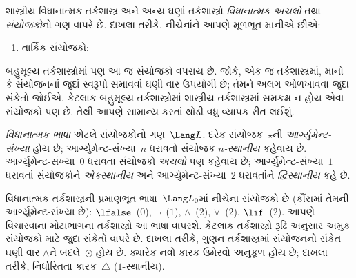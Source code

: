 \documentclass[../../../include/open-logic-section]{subfiles}
\begin{document}


શાસ્ત્રીય વિધાનાત્મક તર્કશાસ્ત્ર અને અન્ય ઘણાં
તર્કશાસ્ત્રો \emph{વિધાનાત્મક અચલો} તથા
\emph{સંયોજકો}નો ગણ વાપરે છે. દાખલા તરીકે,
નીચેનાંને આપણે મૂળભૂત માનીએ છીએ:
\begin{enumerate}
\item તાર્કિક સંયોજકો:
  \startycommalist
\end{enumerate}

બહુમૂલ્ય તર્કશાસ્ત્રોમાં પણ આ જ સંયોજકો વપરાય છે.
જોકે, એક જ તર્કશાસ્ત્રમાં, માનો કે સંયોજનનાં જુદાં
સ્વરૂપો સમાવવાં ઘણી વાર ઉપયોગી છે; તેમને અલગ
ઓળખાવવા જુદા સંકેતો જોઈએ. કેટલાક બહુમૂલ્ય
તર્કશાસ્ત્રોમાં શાસ્ત્રીય તર્કશાસ્ત્રમાં સમકક્ષ ન હોય
એવા સંયોજકો પણ છે. તેથી આપણે સામાન્ય કરતાં
થોડી વધુ વ્યાપક રીત લઈશું.

\begin{defn}
  \emph{વિધાનાત્મક ભાષા} એટલે સંયોજકોનો ગણ~$\Lang L$.
  દરેક સંયોજક~$\star$ની \emph{આર્ગ્યુમેન્ટ-સંખ્યા}
  હોય છે; આર્ગ્યુમેન્ટ-સંખ્યા~$n$ ધરાવતો સંયોજક
  \emph{$n$-સ્થાનીય} કહેવાય છે. આર્ગ્યુમેન્ટ-સંખ્યા~$0$
  ધરાવતા સંયોજકો \emph{અચલો} પણ કહેવાય છે;
  આર્ગ્યુમેન્ટ-સંખ્યા~$1$ ધરાવતાં સંયોજકોને
  \emph{એકસ્થાનીય} અને આર્ગ્યુમેન્ટ-સંખ્યા~$2$
  ધરાવતાંને \emph{દ્વિસ્થાનીય} કહે છે.
\end{defn}

\begin{ex}
  વિધાનાત્મક તર્કશાસ્ત્રની પ્રમાણભૂત ભાષા~$\Lang L_0$માં
  નીચેના સંયોજકો છે (કૌંસમાં તેમની આર્ગ્યુમેન્ટ-સંખ્યા છે):
  $\lfalse$~($0$),
  $\lnot$~($1$),
  $\land$~($2$),
  $\lor$~($2$),
  $\lif$~($2$). આપણે વિચારવાના મોટાભાગના
  તર્કશાસ્ત્રો આ ભાષા વાપરશે. કેટલાક તર્કશાસ્ત્રો
  રૂઢિ અનુસાર અમુક સંયોજકો માટે જુદા સંકેતો
  વાપરે છે. દાખલા તરીકે, ગુણન તર્કશાસ્ત્રમાં
  સંયોજનનો સંકેત ઘણી વાર $\land$ને બદલે~$\odot$
  હોય છે. ક્યારેક નવો કારક ઉમેરવો અનુકૂળ હોય છે;
  દાખલા તરીકે, નિર્ધારિતતા કારક~$\triangle$
  ($1$-સ્થાનીય).
\end{ex}
\end{document}
